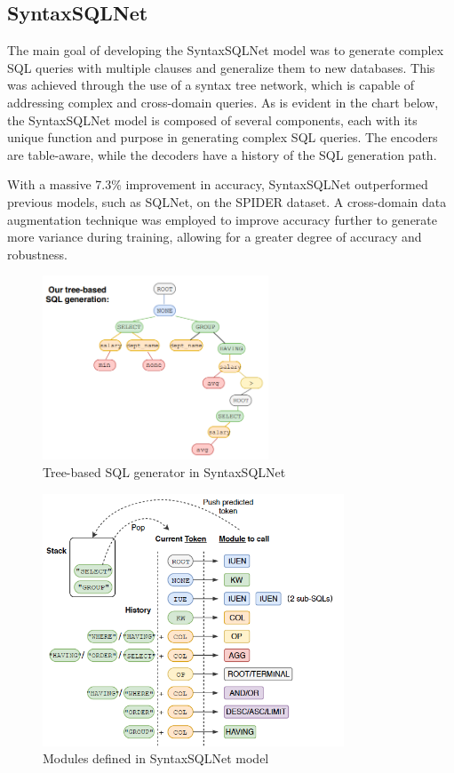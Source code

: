 \subsection{SyntaxSQLNet }

The main\cite{DBLP:journals/corr/abs-1810-05237} goal of developing the SyntaxSQLNet model was to generate complex SQL queries with multiple clauses and generalize them to new databases.
This was achieved through the use of a syntax tree network, which is capable of addressing complex and cross-domain queries.
As is evident in the chart below, the SyntaxSQLNet model is composed of several components, each with its unique function and purpose in generating complex SQL queries. The encoders are table-aware, while the decoders have a history of the SQL generation path.

With a massive 7.3\% improvement in accuracy, SyntaxSQLNet outperformed previous models, such as SQLNet, on the SPIDER dataset.
A cross-domain data augmentation technique was employed to improve accuracy further to generate more variance during training, allowing for a greater degree of accuracy and robustness.

\begin{figure}[htb]
    \centering
    \includegraphics[width=0.6\textwidth]{pics/SyntaxSQLNet/Tree-based.png}
    \caption{Tree-based SQL generator in SyntaxSQLNet}
    \label{fig:tree-based}
\end{figure}

\begin{figure}[htb]
    \centering
    \includegraphics[width=0.8\textwidth]{pics/SyntaxSQLNet/Grammar.png}
    \caption{Modules defined in SyntaxSQLNet model\cite{DBLP:journals/corr/abs-1810-05237}}
    \label{fig:grammar}
\end{figure}

